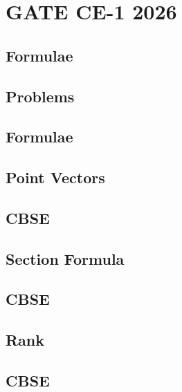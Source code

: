 \documentclass[journal]{IEEEtran}
\begin{document}
\newpage


\tableofcontents

\newpage
\onecolumn


\renewcommand{\thetable}{\theenumi}

\section{GATE CE-1 2026}
\subsection{Formulae}

\newpage
\subsection{Problems}

\iffalse
\subsection{Formulae}

\subsection{Point Vectors}

\subsection{CBSE}

%
\subsection{Section Formula}

\subsection{CBSE}

\subsection{Rank}

\subsection{CBSE}

\end{document}
